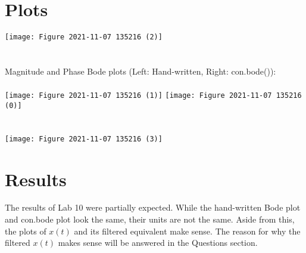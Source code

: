 \documentclass[12pt]{report}
\begin{document}
\section{Plots}
\begin{center}
    \texttt{[image: Figure 2021-11-07 135216 (2)]}\\~\\~\\
    Magnitude and Phase Bode plots (Left: Hand-written, Right: con.bode()):\\~\\
    \texttt{[image: Figure 2021-11-07 135216 (1)]}
    \texttt{[image: Figure 2021-11-07 135216 (0)]}\\~\\~\\
    \texttt{[image: Figure 2021-11-07 135216 (3)]}

\end{center}

\section{Results}
The results of Lab 10 were partially expected. While the hand-written Bode plot and con.bode plot look the same, their units are not the same. Aside from this, the plots of $x(t)$ and its filtered equivalent make sense. The reason for why the filtered $x(t)$ makes sense will be answered in the Questions section.
\pagebreak
\end{document}
